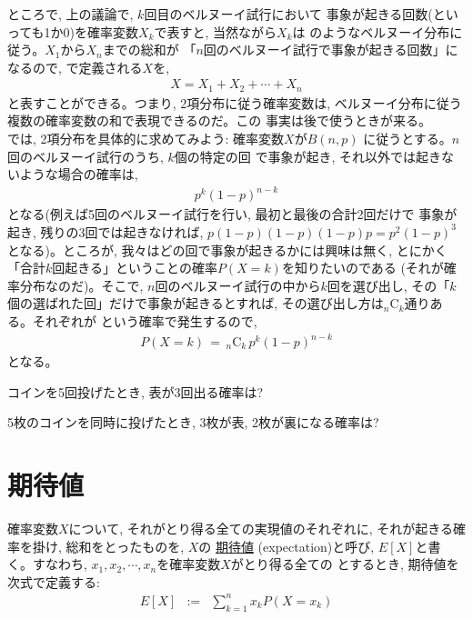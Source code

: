 ところで, 上の議論で, $k$回目のベルヌーイ試行において
事象が起きる回数(といっても1か0)を確率変数$X_k$で表すと, 
当然ながら$X_k$は
のようなベルヌーイ分布に従う。$X_1$から$X_n$までの総和が
「$n$回のベルヌーイ試行で事象が起きる回数」になるので, 
で定義される$X$を, 
\begin{eqnarray}
X=X_1+X_2+\cdots+X_n\label{eq:binom_Bernoulli_sum}
\end{eqnarray}
と表すことができる。つまり, 2項分布に従う確率変数は, 
ベルヌーイ分布に従う複数の確率変数の和で表現できるのだ。この
事実は後で使うときが来る。\\

では, 2項分布を具体的に求めてみよう: 確率変数$X$が$B(n, p)$
に従うとする。$n$回のベルヌーイ試行のうち, $k$個の特定の回
で事象が起き, それ以外では起きないような場合の確率は, 
\begin{eqnarray}
p^k(1-p)^{n-k}\label{eq:stoch_dist_Bernoulli05}
\end{eqnarray}
となる(例えば5回のベルヌーイ試行を行い, 最初と最後の合計2回だけで
事象が起き, 残りの3回では起きなければ, $p(1-p)(1-p)(1-p)p=p^2(1-p)^3$
となる)。ところが, 我々はどの回で事象が起きるかには興味は無く, とにかく
「合計$k$回起きる」ということの確率$P(X=k)$を知りたいのである
(それが確率分布なのだ)。そこで, $n$回のベルヌーイ試行の中から$k$回を選び出し, 
その「$k$個の選ばれた回」だけで事象が起きるとすれば, 
その選び出し方は$_n\text{C}_k$通りある。それぞれが
という確率で発生するので, 
\begin{eqnarray}
P(X=k)\,=\,_n\text{C}_k\,p^k(1-p)^{n-k}\label{eq:stoch_dist_Bernoulli08}
\end{eqnarray}
となる。

\begin{q}\label{q:stat_5_3coins} コインを5回投げたとき, 表が3回出る確率は?\end{q}

\begin{q}\label{q:stat_5_3coins2} 5枚のコインを同時に投げたとき, 
3枚が表, 2枚が裏になる確率は?\end{q}
\mv

\section{期待値}
確率変数$X$について, それがとり得る全ての実現値のそれぞれに, 
それが起きる確率を掛け, 総和をとったものを, $X$の
\underline{期待値} 
(expectation)と呼び, $E[X]$と書く。すなわち, 
$x_1, x_2, \cdots, x_n$を確率変数$X$がとり得る全ての
とするとき, 期待値を次式で定義する:
\begin{eqnarray}
E[X]&:=&\sum_{k=1}^{n}x_kP(X=x_k)\label{eq:def_expectation0}
\end{eqnarray}


